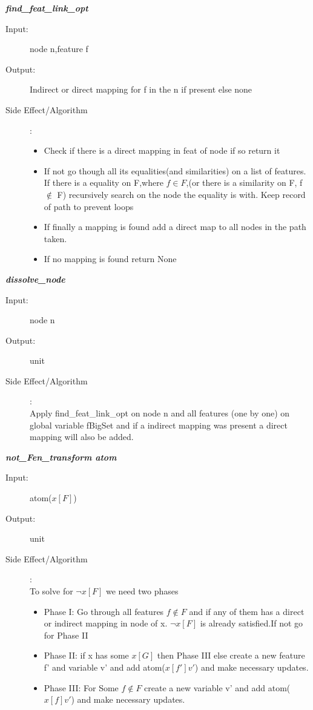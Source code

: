 \documentclass[12pt]{article}
\begin{document}
\begin{description}
\item \textbf{\textit{find\_feat\_link\_opt}}
\begin{description}
    \item[Input:] node n,feature f
    \item[Output:] Indirect or direct mapping for f in the n if present else none
    \item[Side Effect/Algorithm]:
    \begin{itemize}
        \item Check if there is a direct mapping in feat of node if so return it
        \item If not go though all its equalities(and similarities) on a list of features. If there is a equality on F,where $f \in F$,(or there is a similarity on F, f $\not\in$ F) recursively search on the node the equality is with. Keep record of path to prevent loops
        \item If finally a mapping is found add a direct map to all nodes in the path taken.
        \item If no mapping is found return None
    \end{itemize}
\end{description}


\item \textbf{\textit{dissolve\_node}}
\begin{description}
    \item[Input:] node n
    \item[Output:] unit
    \item[Side Effect/Algorithm]:\\Apply find\_feat\_link\_opt on node n and all features (one by one) on global variable fBigSet and if a indirect mapping was present a direct mapping will also be added.\\
\end{description}



\item \textbf{\textit{not\_Fen\_transform atom}}
\begin{description}
    \item[Input:] atom($x[F]$)
    \item[Output:] unit
    \item[Side Effect/Algorithm]:\\To solve for $\lnot x[F]$ we need two phases
    \begin{itemize}
        \item Phase I: Go through all features $f \not\in F$ and if any of them has a direct or indirect mapping in node of x. $\lnot x[F]$ is already satisfied.If not go for Phase II
        \item Phase II: if x has some $x[G]$ then Phase III else create a new feature f' and variable v' and add atom($x[f']v'$) and make necessary updates.
        \item Phase III: For Some $f \not\in F$ create a new variable v' and add atom($x[f]v'$) and make necessary updates.
    \end{itemize}
\end{description}


\end{description}
\end{document}
